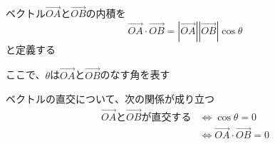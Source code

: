 \documentclass[../book_jiriki_calc]{subfiles}
\begin{document}
ベクトル$\overrightarrow{OA}$と$\overrightarrow{OB}$の内積を
\begin{equation*}
  \overrightarrow{OA}\cdot\overrightarrow{OB} = |\overrightarrow{OA}||\overrightarrow{OB}|\cos\theta
\end{equation*}
と定義する

ここで、$\theta$は$\overrightarrow{OA}$と$\overrightarrow{OB}$のなす角を表す

\sectionline

ベクトルの直交について、次の関係が成り立つ
\begin{align*}
  \overrightarrow{OA}\text{と}\overrightarrow{OB}\text{が直交する}
   & \Leftrightarrow \cos\theta = 0                                  \\
   & \Leftrightarrow \overrightarrow{OA}\cdot\overrightarrow{OB} = 0
\end{align*}
\end{document}

